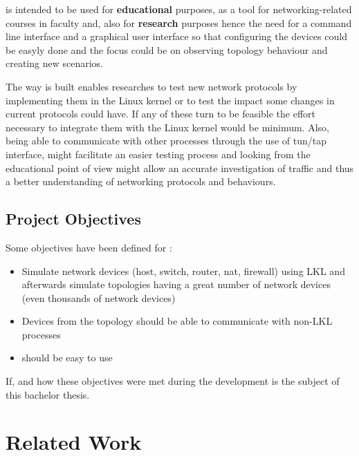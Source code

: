 \project is intended to be used for \textbf{educational} purposes, as a tool for networking-related courses in faculty and, also for \textbf{research} purposes hence the need for a command line interface and a graphical user interface so that configuring the devices could be easyly done and the focus could be on observing topology behaviour and creating new scenarios.

The way \project is built enables researches to test new network protocols by implementing them in the Linux kernel or to test the impact some changes in current protocols could have. If any of these turn to be feasible the effort necessary to integrate them with the Linux kernel would be minimum. Also, being able to communicate with other processes through the use of tun/tap interface, might facilitate an easier testing process and looking from the educational point of view might allow an accurate investigation of traffic and thus a better understanding of networking protocols and behaviours.  

\subsection{Project Objectives}
\label{sub-sec:proj-objectives}
Some objectives have been defined for \project:
\begin{itemize}
\item Simulate network devices (host, switch, router, nat, firewall) using LKL and afterwards simulate topologies having a great number of network devices (even thousands of network devices)
\item Devices from the topology should be able to communicate with non-LKL processes
\item \project should be easy to use
\end{itemize}

If, and how these objectives were met during the \project development is the subject of this bachelor thesis.
\section{Related Work}
\label{sec:proj-related}


